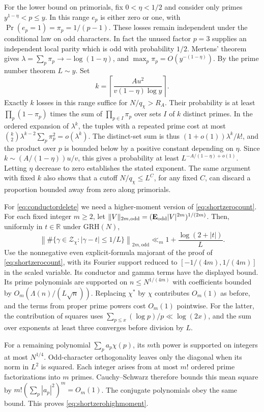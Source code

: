\documentclass[11pt,a4paper]{article}
\numberwithin{equation}{section}
\newcommand{\grh}{\mathrm{GRH}}
\begin{document}
For the lower bound on primorials, fix $0<\eta<1/2$ and
consider only primes $y^{1-\eta}<p\le y$. In this range $e_p$
is either zero or one, with $\Pr(e_p=1)=\pi_p=1/(p-1)$.
These losses remain independent under the conditional law on odd
characters. In fact the unused factor $p=3$ supplies an independent
local parity which is odd with probability $1/2$.
Mertens' theorem gives $\lambda=\sum_p\pi_p\longrightarrow
-\log(1-\eta)$, and $\max_p\pi_p=O(y^{-(1-\eta)})$.
By the prime number theorem $L\sim y$. Set
\[
 k=\left\lceil \frac{Au^2}{v(1-\eta)\log y}\right\rceil .
\]
Exactly $k$ losses in this range suffice for $N/q_\chi>R_A$.
Their probability is at least $\prod_p(1-\pi_p)$ times
the sum of $\prod_{p\in I}\pi_p$ over sets $I$ of $k$ distinct
primes. In the ordered expansion of $\lambda^k$, the tuples
with a repeated prime cost at most
$\binom{k}{2}\lambda^{k-2}\sum_p\pi_p^2=o(\lambda^k)$.
The distinct-set sum is thus $(1+o(1))\lambda^k/k!$,
and the product over $p$ is bounded below by a positive
constant depending on $\eta$. Since
$k\sim (A/(1-\eta))u/v$, this gives a probability at least
$L^{-A/(1-\eta)+o(1)}$. Letting $\eta$ decrease to zero
establishes the stated exponent. The same argument with fixed
$k$ also shows that a cutoff $N/q_\chi\le L^C$, for any fixed
$C$, can discard a proportion bounded away from zero along
primorials.

For \cref{eq:conductordelete} we need a higher-moment version of
\cref{eq:shortzerocount}. For each fixed integer $m\ge2$, let
$\|V\|_{2m,\mathrm{odd}}=(\mathbf E_{\rm odd}|V|^{2m})^{1/(2m)}$.
Then, uniformly in $t\in\mathbb R$ under $\grh(N)$,
\begin{equation}
 \left\|\#\{\gamma\in\mathcal Z_\chi:|\gamma-t|\le1/L\}
         \right\|_{2m,\mathrm{odd}}
 \ll_m 1+\frac{\log(2+|t|)}{L}.
 \label{eq:shortzerohighmoment}
\end{equation}
Use the nonnegative even explicit-formula majorant of the proof of
\cref{eq:shortzerocount}, with its Fourier support reduced to
$[-1/(4m),1/(4m)]$ in the scaled variable. Its conductor and gamma
terms have the displayed bound. Its prime polynomials are supported
on $n\le N^{1/(4m)}$ with coefficients bounded by
$O_m(\Lambda(n)/(L\sqrt n))$. Replacing $\chi^*$ by $\chi$
contributes $O_m(1)$ as before, and the terms from proper prime
powers cost $O_m(1)$ pointwise. For the latter, the contribution of
squares uses $\sum_{p\le x}(\log p)/p\ll\log(2x)$, and the sum
over exponents at least three converges before division by $L$.

For a remaining polynomial $\sum_p a_p\chi(p)$, its $m$th
power is supported on integers at most $N^{1/4}$. Odd-character
orthogonality leaves only the diagonal when its norm in
$L^2$ is squared. Each integer arises from at most $m!$ ordered
prime factorizations into $m$ primes. Cauchy--Schwarz therefore
bounds this mean square by $m!(\sum_p|a_p|^2)^m=O_m(1)$.
The conjugate polynomials obey the same bound. This proves
\cref{eq:shortzerohighmoment}.
\end{document}
